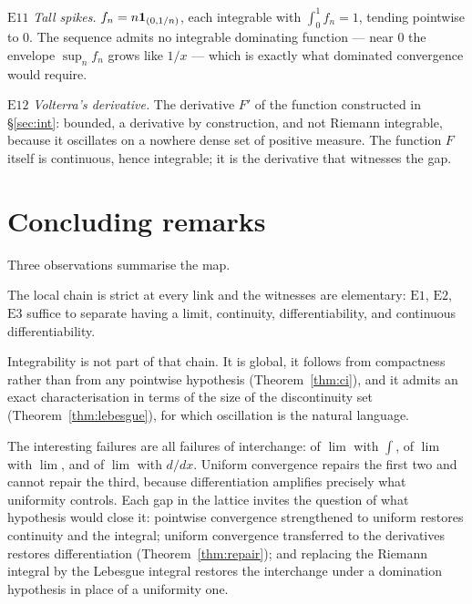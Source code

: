 \smallskip\noindent
$\mathrm{E}11$ \emph{Tall spikes.} $f_n = n\mathbf{1}_{(0,1/n)}$, each integrable
with $\int_0^1 f_n = 1$, tending pointwise to $0$. The sequence admits no
integrable dominating function --- near $0$ the envelope $\sup_n f_n$ grows
like $1/x$ --- which is exactly what dominated convergence would require.

\smallskip\noindent
$\mathrm{E}12$ \emph{Volterra's derivative.} The derivative $F'$ of the
function constructed in \S\ref{sec:int}: bounded, a derivative by
construction, and not Riemann integrable, because it oscillates on a nowhere
dense set of positive measure. The function $F$ itself is continuous, hence
integrable; it is the derivative that witnesses the gap.

\section{Concluding remarks}

Three observations summarise the map.

The local chain is strict at every link and the witnesses are elementary:
$\mathrm{E}1$, $\mathrm{E}2$, $\mathrm{E}3$ suffice to separate having a
limit, continuity, differentiability, and continuous differentiability.

Integrability is not part of that chain. It is global, it follows from
compactness rather than from any pointwise hypothesis
(Theorem~\ref{thm:ci}), and it admits an exact characterisation in terms of
the size of the discontinuity set (Theorem~\ref{thm:lebesgue}), for which
oscillation is the natural language.

The interesting failures are all failures of interchange: of $\lim$ with
$\int$, of $\lim$ with $\lim$, and of $\lim$ with $d/dx$. Uniform convergence
repairs the first two and cannot repair the third, because differentiation
amplifies precisely what uniformity controls. Each gap in the lattice invites
the question of what hypothesis would close it: pointwise convergence
strengthened to uniform restores continuity and the integral; uniform
convergence transferred to the derivatives restores differentiation
(Theorem~\ref{thm:repair}); and replacing the Riemann integral by the
Lebesgue integral restores the interchange under a domination hypothesis in
place of a uniformity one.
